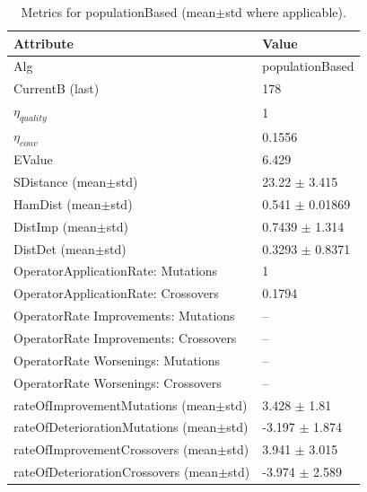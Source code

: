 \begin{table}[t]
\centering
\small
\begin{tabular}{ll}
\toprule
Attribute & Value \\
\midrule
Alg & populationBased \\
CurrentB (last) & 178 \\
$\eta_{quality}$ & 1 \\
$\eta_{conv}$ & 0.1556 \\
EValue & 6.429 \\
SDistance (mean$\pm$std) & 23.22 $\pm$ 3.415 \\
HamDist (mean$\pm$std) & 0.541 $\pm$ 0.01869 \\
DistImp (mean$\pm$std) & 0.7439 $\pm$ 1.314 \\
DistDet (mean$\pm$std) & 0.3293 $\pm$ 0.8371 \\
OperatorApplicationRate: Mutations & 1 \\
OperatorApplicationRate: Crossovers & 0.1794 \\
OperatorRate Improvements: Mutations & -- \\
OperatorRate Improvements: Crossovers & -- \\
OperatorRate Worsenings: Mutations & -- \\
OperatorRate Worsenings: Crossovers & -- \\
rateOfImprovementMutations (mean$\pm$std) & 3.428 $\pm$ 1.81 \\
rateOfDeteriorationMutations (mean$\pm$std) & -3.197 $\pm$ 1.874 \\
rateOfImprovementCrossovers (mean$\pm$std) & 3.941 $\pm$ 3.015 \\
rateOfDeteriorationCrossovers (mean$\pm$std) & -3.974 $\pm$ 2.589 \\
\bottomrule
\end{tabular}
\caption{Metrics for populationBased (mean$\pm$std where applicable).}
\label{tab:metrics}
\end{table}
